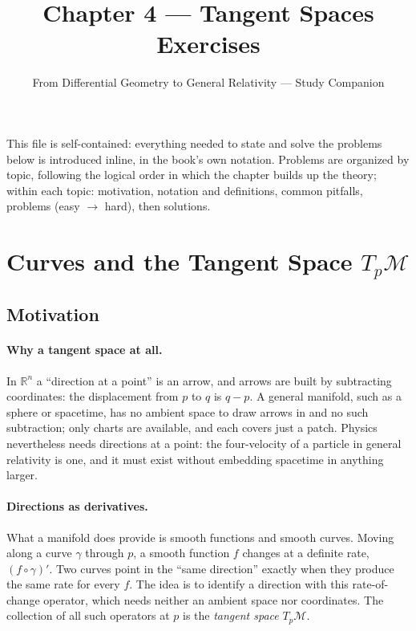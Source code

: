 \documentclass[11pt]{article}
\title{Chapter 4 --- Tangent Spaces\\ \large Exercises}
\author{From Differential Geometry to General Relativity --- Study Companion}
\date{}
\begin{document}
\maketitle

\noindent This file is self-contained: everything needed to state and solve
the problems below is introduced inline, in the book's own notation. Problems
are organized by topic, following the logical order in which the chapter
builds up the theory; within each topic: motivation, notation and
definitions, common pitfalls, problems (easy $\to$ hard), then solutions.

\section{Curves and the Tangent Space $T_p\mathcal M$}

\subsection*{Motivation}

\paragraph{Why a tangent space at all.}
In $\mathbb R^n$ a ``direction at a point'' is an arrow, and arrows are built by subtracting coordinates: the displacement from $p$ to $q$ is $q-p$. A general manifold, such as a sphere or spacetime, has no ambient space to draw arrows in and no such subtraction; only charts are available, and each covers just a patch. Physics nevertheless needs directions at a point: the four-velocity of a particle in general relativity is one, and it must exist without embedding spacetime in anything larger.

\paragraph{Directions as derivatives.}
What a manifold does provide is smooth functions and smooth curves. Moving along a curve $\gamma$ through $p$, a smooth function $f$ changes at a definite rate, $(f\circ\gamma)'$. Two curves point in the ``same direction'' exactly when they produce the same rate for every $f$. The idea is to identify a direction with this rate-of-change operator, which needs neither an ambient space nor coordinates. The collection of all such operators at $p$ is the \emph{tangent space} $T_p\mathcal M$.
\end{document}
